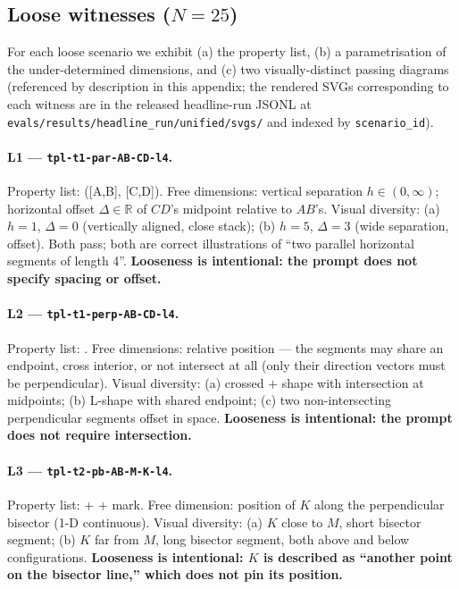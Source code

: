 \subsection{Loose witnesses ($N{=}25$)}
\label{app:completeness_witnesses:loose}

For each loose scenario we exhibit (a) the property list, (b) a parametrisation of the under-determined dimensions, and (c) two visually-distinct passing diagrams (referenced by description in this appendix; the rendered SVGs corresponding to each witness are in the released headline-run JSONL at \texttt{evals/results/headline\_run/unified/svgs/} and indexed by \texttt{scenario\_id}).

\paragraph{L1 --- \texttt{tpl-t1-par-AB-CD-l4}.}
Property list: ([A,B], [C,D]).
Free dimensions: vertical separation $h \in (0, \infty)$; horizontal offset $\Delta \in \mathbb{R}$ of $CD$'s midpoint relative to $AB$'s.
Visual diversity: (a) $h{=}1$, $\Delta{=}0$ (vertically aligned, close stack); (b) $h{=}5$, $\Delta{=}3$ (wide separation, offset). Both pass; both are correct illustrations of ``two parallel horizontal segments of length 4''.
\textbf{Looseness is intentional: the prompt does not specify spacing or offset.}

\paragraph{L2 --- \texttt{tpl-t1-perp-AB-CD-l4}.}
Property list: .
Free dimensions: relative position --- the segments may share an endpoint, cross interior, or not intersect at all (only their direction vectors must be perpendicular).
Visual diversity: (a) crossed $+$ shape with intersection at midpoints; (b) L-shape with shared endpoint; (c) two non-intersecting perpendicular segments offset in space.
\textbf{Looseness is intentional: the prompt does not require intersection.}

\paragraph{L3 --- \texttt{tpl-t2-pb-AB-M-K-l4}.}
Property list:  +  + mark.
Free dimension: position of $K$ along the perpendicular bisector (1-D continuous).
Visual diversity: (a) $K$ close to $M$, short bisector segment; (b) $K$ far from $M$, long bisector segment, both above and below configurations.
\textbf{Looseness is intentional: $K$ is described as ``another point on the bisector line,'' which does not pin its position.}

